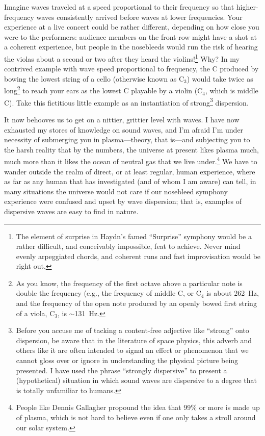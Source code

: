 Imagine waves traveled at a speed proportional to their frequency so that
higher-frequency waves consistently arrived before waves at lower
frequencies. Your experience at a live concert could be rather different,
depending on how close you were to the performers: audience members on the
front-row might have a shot at a coherent experience, but people in the
nosebleeds would run the risk of hearing the violas about a second or two after
they heard the violins!\footnote{The element of surprise in Haydn's famed
  ``Surprise'' symphony would be a rather difficult, and conceivably impossible,
  feat to achieve. Never mind evenly arpeggiated chords, and coherent runs and
  fast improvisation would be right out.} Why? In my contrived example with wave
speed proportional to frequency, the C produced by bowing the lowest string of a
cello (otherwise known as $\textrm{C}_3$) would take twice as long\footnote{As
  you know, the frequency of the first octave above a particular note is double
  the frequency (e.g., the frequency of middle C, or $\textrm{C}_4$ is about
  262~Hz, and the frequency of the open note produced by an openly bowed first
  string of a viola, $\textrm{C}_3$, is $\sim$131~Hz.} to reach your ears as the
lowest C playable by a violin ($\textrm{C}_4$, which is middle C). Take this
fictitious little example as an instantiation of strong\footnote{Before you
  accuse me of tacking a content-free adjective like ``strong'' onto dispersion,
  be aware that in the literature of space physics, this adverb and others like
  it are often intended to signal an effect or phenomenon that we cannot gloss
  over or ignore in understanding the physical picture being presented. I have
  used the phrase ``strongly dispersive'' to present a (hypothetical) situation
  in which sound waves are dispersive to a degree that is totally unfamiliar to
  humans.}  dispersion.

It now behooves us to get on a nittier, grittier level with \Alf waves. I have
now exhausted my stores of knowledge on sound waves, and I'm afraid I'm under
necessity of submerging you in plasma---theory, that is---and subjecting you to
the harsh reality that by the numbers, the universe at present likes plasma
much, much more than it likes the ocean of neutral gas that we live
under.\footnote{People like Dennis Gallagher propound the idea that 99\% or more
  is made up of plasma, which is not hard to believe even if one only takes a
  stroll around our solar system.} We have to wander outside the realm of
direct, or at least regular, human experience, where as far as any human that
has investigated (and of whom I am aware) can tell, in many situations the
universe would not care if our nosebleed symphony experience were confused and
upset by wave dispersion; that is, examples of dispersive waves are easy to find
in nature. 

